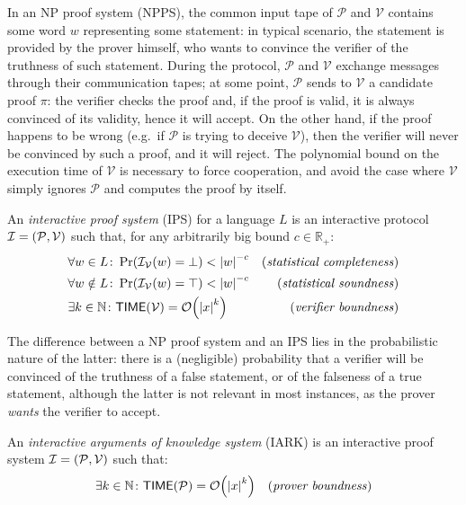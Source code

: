 In an \textsc{NP} proof system (\textsc{NP}PS), the common input tape of \(\mathcal{P}\) and 
\(\mathcal{V}\) contains some word \(w\) representing some statement: in typical scenario, the 
statement is provided by the prover himself, who wants to convince the verifier of the truthness of 
such statement.
During the protocol, \(\mathcal{P}\) and \(\mathcal{V}\) exchange messages through their 
communication tapes; at some point, \(\mathcal{P}\) sends to \(\mathcal{V}\) a candidate proof 
\(\pi \): the verifier checks the proof and, if the proof is valid, it is always convinced of its 
validity, hence it will accept. 
On the other hand, if the proof happens to be wrong (e.g.\ if \(\mathcal{P}\) is trying to deceive
\(\mathcal{V}\)), then the verifier will never be convinced by such a proof, and it will reject.
The polynomial bound on the execution time of \(\mathcal{V}\) is necessary to force cooperation, 
and avoid the case where \(\mathcal{V}\) simply ignores \(\mathcal{P}\) and computes the proof by 
itself.
\begin{definition}  
  An \emph{interactive proof system} (IPS) for a language \(L\) is an interactive protocol 
  \(\mathcal{I} = \left(\mathcal{P}, \mathcal{V}\right)\) such that, for any arbitrarily big bound
  \(c \in \mathbb{R}_{+}\):
  \begin{align*}
    & \forall w \in L\colon \call{\Pr}{\call{\mathcal{I}_{\mathcal{V}}}{w} = \bot} < \abs{w}^{-c}  
      & \textnormal{(\emph{statistical completeness})} \\
    & \forall w \notin L\colon \call{\Pr}{\call{\mathcal{I}_{\mathcal{V}}}{w} = \top} < \abs{w}^{-c} 
      & \textnormal{(\emph{statistical soundness})} \\
    & \exists k \in \mathbb{N}\colon \call{\Time}{\mathcal{V}} = \BigO{\abs{x}^k} & 
    \textnormal{(\emph{verifier boundness})}
  \end{align*}
\end{definition}

The difference between a NP proof system and an IPS lies 
in the probabilistic nature of the latter: there is a (negligible) probability that a verifier 
will be convinced of the truthness of a false statement, or of the falseness of a true statement, 
although the latter is not relevant in most instances, as the prover \emph{wants} the verifier 
to accept.
\begin{definition}
  An \emph{interactive arguments of knowledge system} (IARK) is an interactive proof system 
  \(\mathcal{I} = \left(\mathcal{P}, \mathcal{V}\right)\) such that:
  \begin{align*}
    & \exists k \in \mathbb{N}\colon \call{\Time}{\mathcal{P}} = \BigO{\abs{x}^k} & 
    \textnormal{(\emph{prover boundness})}
  \end{align*}
\end{definition}


